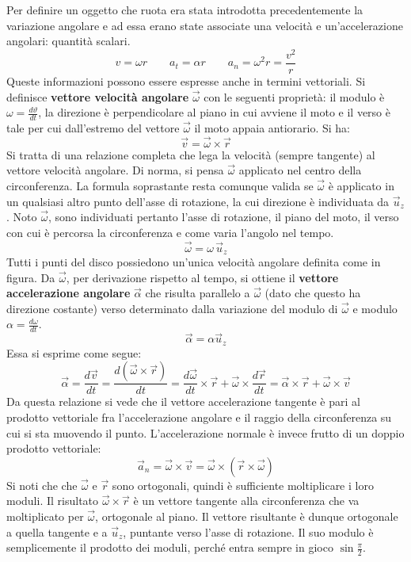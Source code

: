 \documentclass[10pt,a4paper]{book}
\begin{document}
Per definire un oggetto che ruota era stata introdotta precedentemente la variazione angolare e ad essa erano state associate una velocità e un'accelerazione angolari: quantità scalari.
\[
	v=\omega r \qquad a_t=\alpha r \qquad a_n=\omega^2 r=\frac{v^2}{r}
\]
Queste informazioni possono essere espresse anche in termini vettoriali. Si definisce \textbf{vettore velocità angolare} $\vec{\omega}$ con le seguenti proprietà: il modulo è $\omega=\frac{d\vartheta}{dt}$, la direzione è perpendicolare al piano in cui avviene il moto e il verso è tale per cui dall'estremo del vettore $\vec{\omega}$ il moto appaia antiorario. Si ha:
\[
	\vec{v}=\vec{\omega} \times \vec{r}
\]
Si tratta di una relazione completa che lega la velocità (sempre tangente) al vettore velocità angolare. Di norma, si pensa $\vec{\omega}$ applicato nel centro della circonferenza. La formula soprastante resta comunque valida se $\vec{\omega}$ è applicato in un qualsiasi altro punto dell'asse di rotazione, la cui direzione è individuata da $\vec{u}_z$. Noto $\vec{\omega}$, sono individuati pertanto l'asse di rotazione, il piano del moto, il verso con cui è percorsa la circonferenza e come varia l'angolo nel tempo.
\[
	\vec{\omega}=\omega\, \vec{u}_z
\]
Tutti i punti del disco possiedono un'unica velocità angolare definita come in figura. Da $\vec{\omega}$, per derivazione rispetto al tempo, si ottiene il \textbf{vettore accelerazione angolare} $\vec{\alpha}$ che risulta parallelo a $\vec{\omega}$ (dato che questo ha direzione costante) verso determinato dalla variazione del modulo di $\vec{\omega}$ e modulo $\alpha=\frac{d\omega}{dt}$.
\[
	\vec{\alpha}=\alpha \vec{u}_z
\]
Essa si esprime come segue:
\[
	\vec{\alpha}=\frac{d\vec{v}}{dt}=\frac{d(\vec{\omega} \times \vec{r})}{dt}=\frac{d\vec{\omega}}{dt} \times \vec{r}+\vec{\omega} \times \frac{d\vec{r}}{dt}=\vec{\alpha} \times \vec{r} + \vec{\omega} \times \vec{v}
\]
Da questa relazione si vede che il vettore accelerazione tangente è pari al prodotto vettoriale fra l'accelerazione angolare e il raggio della circonferenza su cui si sta muovendo il punto. L'accelerazione normale è invece frutto di un doppio prodotto vettoriale:
\[
	\vec{a}_n=\vec{\omega} \times \vec{v}=\vec{\omega} \times ( \vec{r} \times \vec{\omega})
\]
Si noti che che $\vec{\omega}$ e $\vec{r}$ sono ortogonali, quindi è sufficiente moltiplicare i loro moduli. Il risultato $\vec{\omega} \times \vec{r}$ è un vettore tangente alla circonferenza che va moltiplicato per $\vec{\omega}$, ortogonale al piano. Il vettore risultante è dunque ortogonale a quella tangente e a $\vec{u}_z$, puntante verso l'asse di rotazione. Il suo modulo è semplicemente il prodotto dei moduli, perché entra sempre in gioco $\sin\frac{\pi}{2}$.
\end{document}
